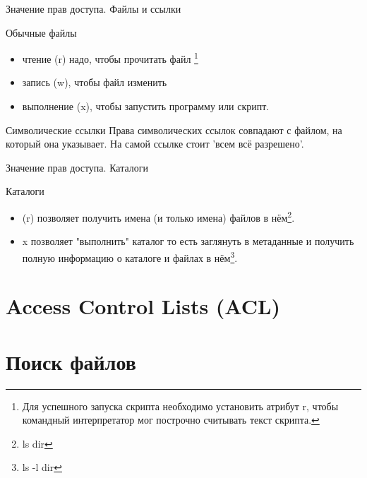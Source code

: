 \begin{frame}{Значение прав доступа. Файлы и ссылки}

  \begin{block}{Обычные файлы}
    \begin{itemize}
      \item чтение \alert{(r)} надо, чтобы прочитать файл
	\footnote{Для успешного запуска скрипта необходимо установить атрибут \alert{r}, чтобы командный интерпретатор мог построчно считывать текст скрипта.}
      \item запись \alert{(w)}, чтобы файл изменить
      \item выполнение \alert{(x)}, чтобы запустить программу или скрипт.
    \end{itemize}
  \end{block} \pause

  \begin{block}{Символические ссылки}
    \small{Права символических ссылок совпадают с файлом, на который она указывает. На самой ссылке стоит 'всем всё разрешено'.}
  \end{block}

\end{frame}

\begin{frame}{Значение прав доступа. Каталоги}
  \begin{block}{Каталоги}
    \begin{itemize}
      \item \alert{(r)} позволяет получить имена (и только имена) файлов в нём\footnote{ls dir}. 
      \item \alert{x} позволяет "выполнить" каталог\newline
	то есть заглянуть в метаданные  и получить полную информацию о каталоге и файлах в нём\footnote{ls -l dir}.
    \end{itemize}
  \end{block}
\end{frame}

\section{Access Control Lists (ACL)}

\section{Поиск файлов}


